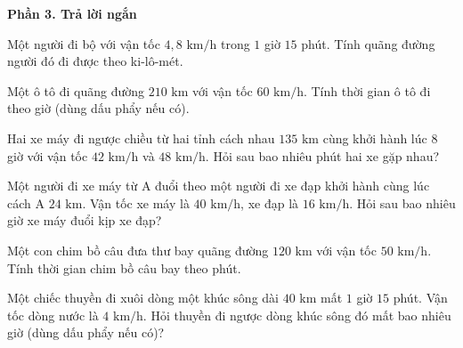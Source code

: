 \textbf{Phần 3. Trả lời ngắn}

\begin{ex} %
Một người đi bộ với vận tốc $4{,}8\text{ km/h}$ trong $1$ giờ $15$ phút. Tính quãng đường người đó đi được theo ki-lô-mét.
\end{ex}

\begin{ex} %
Một ô tô đi quãng đường $210\text{ km}$ với vận tốc $60\text{ km/h}$. Tính thời gian ô tô đi theo giờ (dùng dấu phẩy nếu có).
\end{ex}

\begin{ex} %
Hai xe máy đi ngược chiều từ hai tỉnh cách nhau $135\text{ km}$ cùng khởi hành lúc $8$ giờ với vận tốc $42\text{ km/h}$ và $48\text{ km/h}$. Hỏi sau bao nhiêu phút hai xe gặp nhau?
\end{ex}

\begin{ex} %
Một người đi xe máy từ A đuổi theo một người đi xe đạp khởi hành cùng lúc cách A $24\text{ km}$. Vận tốc xe máy là $40\text{ km/h}$, xe đạp là $16\text{ km/h}$. Hỏi sau bao nhiêu giờ xe máy đuổi kịp xe đạp?
\end{ex}

\begin{ex} %
Một con chim bồ câu đưa thư bay quãng đường $120\text{ km}$ với vận tốc $50\text{ km/h}$. Tính thời gian chim bồ câu bay theo phút.
\end{ex}

\begin{ex} %
Một chiếc thuyền đi xuôi dòng một khúc sông dài $40\text{ km}$ mất $1$ giờ $15$ phút. Vận tốc dòng nước là $4\text{ km/h}$. Hỏi thuyền đi ngược dòng khúc sông đó mất bao nhiêu giờ (dùng dấu phẩy nếu có)?
\end{ex}
